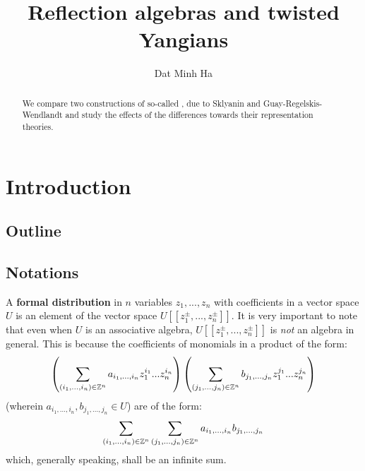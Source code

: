 

\setcounter{section}{-1}


\newcommand{\scattering}{\mathrm{B_{sc}}} %
\newcommand{\symmetric}{\mathrm{B_{sym}}} %



    \title{Reflection algebras and twisted Yangians}
    
    \author{Dat Minh Ha}
    \maketitle
    
    \begin{abstract}
        We compare two constructions of so-called , due to Sklyanin and Guay-Regelskis-Wendlandt and study the effects of the differences towards their representation theories.
    \end{abstract}
    
    {
    \hypersetup{} 
    \tableofcontents %
    }

    \section{Introduction}
        \subsection{Outline}

        \subsection{Notations}
            A \textbf{formal distribution} in $n$ variables $z_1, ..., z_n$ with coefficients in a vector space $U$ is an element of the vector space $U[\![z_1^{\pm}, ..., z_n^{\pm}]\!]$. It is very important to note that even when $U$ is an associative algebra, $U[\![z_1^{\pm}, ..., z_n^{\pm}]\!]$ is \textit{not} an algebra in general. This is because the coefficients of monomials in a product of the form:
                $$\left( \sum_{(i_1, ..., i_n) \in \mathbb{Z}^n} a_{i_1, ..., i_n} z_1^{i_1} ... z_n^{i_n} \right) \left( \sum_{(j_1, ..., j_n) \in \mathbb{Z}^n} b_{j_1, ..., j_n} z_1^{j_1} ... z_n^{j_n} \right)$$
            (wherein $a_{i_1, ..., i_n}, b_{j_1, ..., j_n} \in U$) are of the form:
                $$\sum_{(i_1, ..., i_n) \in \mathbb{Z}^n} \sum_{(j_1, ..., j_n) \in \mathbb{Z}^n} a_{i_1, ..., i_n} b_{j_1, ..., j_n}$$
            which, generally speaking, shall be an infinite sum.

